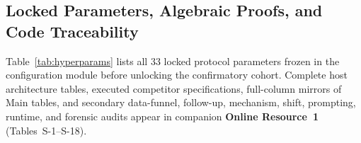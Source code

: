 \documentclass[pdflatex,sn-basic]{sn-jnl}
\theoremstyle{definition}
\theoremstyle{plain}
\begin{document}
\begin{appendices}
\renewcommand{\theHtable}{\thesection.\arabic{table}}

\section{Locked Parameters, Algebraic Proofs, and Code Traceability}
\label{app:repro}

Table~\ref{tab:hyperparams} lists all 33 locked protocol parameters frozen in the configuration module before unlocking the confirmatory cohort. Complete host architecture tables, executed competitor specifications, full-column mirrors of Main tables, and secondary data-funnel, follow-up, mechanism, shift, prompting, runtime, and forensic audits appear in companion \textbf{Online Resource~1} (Tables~S-1--S-18).


\end{appendices}
\end{document}

